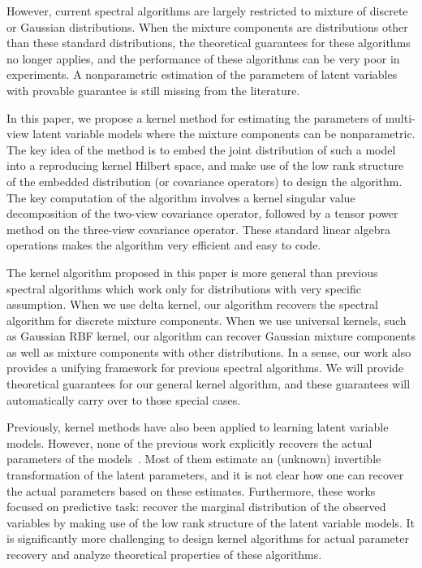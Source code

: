 \documentclass{article}
\begin{document}
However, current spectral algorithms are largely restricted to mixture
of discrete or Gaussian distributions. When the mixture components are distributions other than these standard distributions, the theoretical guarantees for these algorithms no longer applies, and the performance of these algorithms can be very poor in experiments. A nonparametric estimation of the parameters of latent variables with provable guarantee is still missing from the literature.

In this paper, we propose a kernel method for estimating the parameters of multi-view latent variable models where the mixture components can be nonparametric. The key idea of the method is to embed the joint distribution of such a model into a reproducing kernel Hilbert space, and make use of the low rank structure of the embedded distribution (or covariance operators) to design the algorithm. The key computation of the algorithm involves a kernel singular value decomposition of the two-view covariance operator, followed by a tensor power method on the three-view covariance operator. These standard linear algebra operations makes the algorithm very efficient and easy to code.

The kernel algorithm proposed in this paper is more general than previous spectral algorithms which work only for distributions with very specific assumption. When we use delta kernel, our algorithm recovers the spectral algorithm for discrete mixture components. When we use universal kernels, such as Gaussian RBF kernel, our algorithm can recover Gaussian mixture components as well as mixture components with other distributions. In a sense, our work also provides a unifying framework for previous spectral algorithms. We will provide theoretical guarantees for our general kernel algorithm, and these guarantees will automatically carry over to those special cases.

Previously, kernel methods have also been applied to learning latent variable models. However, none of the previous work explicitly recovers the actual parameters of the models~\cite{xxx}. Most of them estimate an (unknown) invertible  transformation of the latent parameters, and it is not clear how one can recover the actual parameters based on these estimates. Furthermore, these works focused on predictive task: recover the marginal distribution of the observed variables by making use of the low rank structure of the latent variable models. It is significantly more challenging to design kernel algorithms for actual parameter recovery and analyze theoretical properties of these algorithms.
\end{document}
